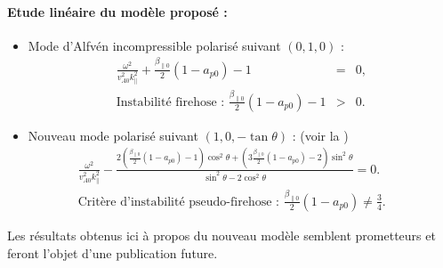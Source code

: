 {\begin{minipage}[c]{\linewidth}
\paragraph{Etude linéaire du modèle proposé : }
\begin{itemize}
    \item Mode d'Alfvén incompressible polarisé suivant $(0,1,0)$ :
\begin{eqnarray}
\label{eq:synth_lininc_disp1}    
  \frac{\omega^2}{v^2_{A0}k^2_{\parallel}} + \frac{\beta_{\parallel 0}}{2}(1-a_{p0})-1  &=&0,\\
\text{Instabilité firehose : } \frac{\beta_{\parallel 0}}{2}(1-a_{p0})-1 &>&0 .
\end{eqnarray} 
    \item Nouveau mode polarisé suivant $(1,0,- \tan \theta)$ : (voir la )
\begin{eqnarray}
\label{eq:synth_lininc_disp2}    
  \frac{\omega^2}{v^2_{A0}k^2_{\parallel}} - \frac{2(\frac{\beta_{\parallel 0}}{2}(1-a_{p0})-1)\cos^2 \theta 
  +  ( 3\frac{\beta_{\parallel 0}}{2}(1-a_{p0}) - 2) \sin^2 \theta}{\sin^2 \theta-2\cos^2 \theta}  =0. && \\
\text{Critère d'instabilité pseudo-firehose : }  \frac{\beta_{\parallel 0}}{2}(1-a_{p0}) \neq \frac{3}{4}. && 
\end{eqnarray} 
\end{itemize}


Les résultats obtenus ici à propos du nouveau modèle semblent prometteurs et feront l'objet d'une publication future. 
\end{minipage}}
